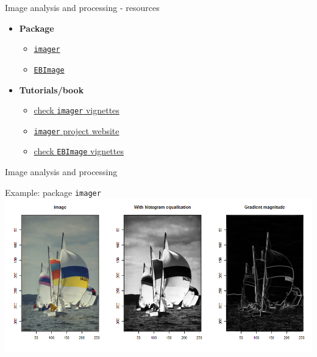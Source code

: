 \documentclass[9pt,ignorenonframetext,]{beamer}
\providecommand{\tightlist}{%
  \setlength{\itemsep}{0pt}\setlength{\parskip}{0pt}}
\begin{document}
\begin{frame}[fragile]{Image analysis and processing - resources}

\begin{itemize}
\tightlist
\item
  \textbf{Package}

  \begin{itemize}
  \tightlist
  \item
    \href{https://cran.r-project.org/web/packages/imager/index.html}{\texttt{imager}}
  \item
    \href{https://cran.r-project.org/web/packages/EBImage/index.html}{\texttt{EBImage}}
  \end{itemize}
\item
  \textbf{Tutorials/book}

  \begin{itemize}
  \tightlist
  \item
    \href{https://cran.r-project.org/web/packages/imager/index.html}{check
    \texttt{imager} vignettes}
  \item
    \href{https://dahtah.github.io/imager/}{\texttt{imager} project
    website}
  \item
    \href{https://www.bioconductor.org/packages/3.7/bioc/vignettes/EBImage/inst/doc/EBImage-introduction.html}{check
    \texttt{EBImage} vignettes}
  \end{itemize}
\end{itemize}

\end{frame}

\begin{frame}[fragile]{Image analysis and processing}

Example: package \texttt{imager}
\includegraphics{imgPres/image_processing.png}

\end{frame}
\end{document}

